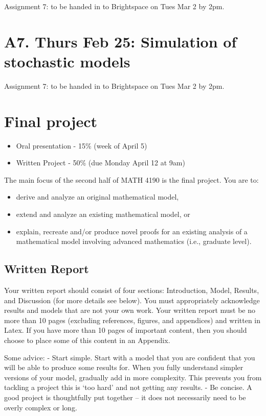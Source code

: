 \documentclass[]{book}
\providecommand{\tightlist}{%
  \setlength{\itemsep}{0pt}\setlength{\parskip}{0pt}}
\begin{document}
Assignment 7: to be handed in to Brightspace on Tues Mar 2 by 2pm.

\chapter{A7. Thurs Feb 25: Simulation of stochastic
models}\label{a7.-thurs-feb-25-simulation-of-stochastic-models}

Assignment 7: to be handed in to Brightspace on Tues Mar 2 by 2pm.

\chapter{Final project}\label{final-project}

\begin{itemize}
\tightlist
\item
  Oral presentation - 15\% (week of April 5)
\item
  Written Project - 50\% (due Monday April 12 at 9am)
\end{itemize}

The main focus of the second half of MATH 4190 is the final project. You
are to:

\begin{itemize}
\tightlist
\item
  derive and analyze an original mathematical model,
\item
  extend and analyze an existing mathematical model, or
\item
  explain, recreate and/or produce novel proofs for an existing analysis
  of a mathematical model involving advanced mathematics (i.e., graduate
  level).
\end{itemize}

\section{Written Report}\label{written-report}

Your written report should consist of four sections: Introduction,
Model, Results, and Discussion (for more details see below). You must
appropriately acknowledge results and models that are not your own work.
Your written report must be no more than 10 pages (excluding references,
figures, and appendices) and written in Latex. If you have more than 10
pages of important content, then you should choose to place some of this
content in an Appendix.

Some advice: - Start simple. Start with a model that you are confident
that you will be able to produce some results for. When you fully
understand simpler versions of your model, gradually add in more
complexity. This prevents you from tackling a project this is `too hard'
and not getting any results. - Be concise. A good project is
thoughtfully put together -- it does not necessarily need to be overly
complex or long.
\end{document}
